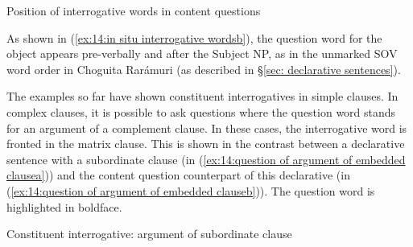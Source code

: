 \ea\label{ex:14:in situ interrogative words}
{Position of interrogative words in content questions}

    \label{ex:14:in situ interrogative wordsa}
        \label{ex:14:in situ interrogative wordsb}
    \z
\z

\largerpage
As shown in (\ref{ex:14:in situ interrogative wordsb}), the question word for the object appears pre-verbally and after the Subject NP, as in the unmarked SOV word order in Choguita Rarámuri (as described in §\ref{sec: declarative sentences}).

The examples so far have shown constituent interrogatives in simple clauses. In complex clauses, it is possible to ask questions where the question word stands for an argument of a complement clause. In these cases, the interrogative word is fronted in the matrix clause. This is shown in the contrast between a declarative sentence with a subordinate clause (in (\ref{ex:14:question of argument of embedded clausea})) and the content question counterpart of this declarative (in (\ref{ex:14:question of argument of embedded clauseb})). The question word is highlighted in boldface.

\ea\label{ex:14:question of argument of embedded clause}
{Constituent interrogative: argument of subordinate clause}\\

